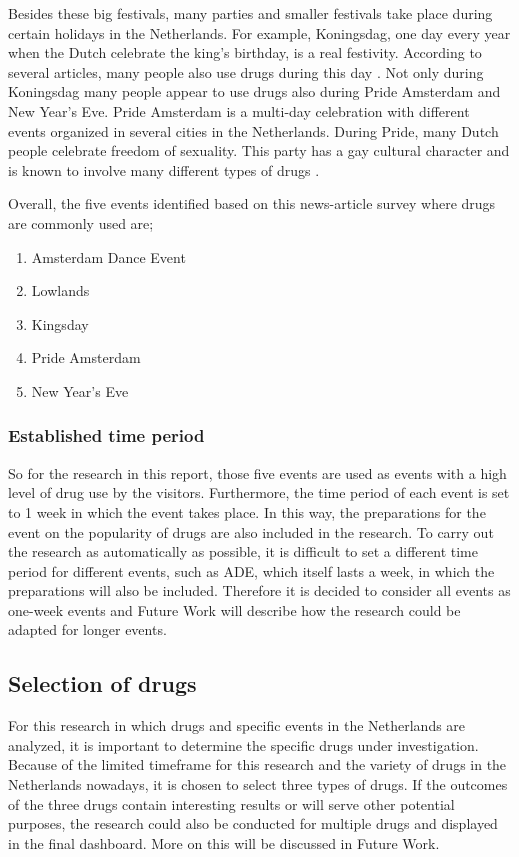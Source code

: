 Besides these big festivals, many parties and smaller festivals take place during certain holidays in the Netherlands. For example, Koningsdag, one day every year when the Dutch celebrate the king's birthday, is a real festivity. According to several articles, many people also use drugs during this day \cite{Boer}. Not only during Koningsdag many people appear to use drugs also during Pride Amsterdam and New Year's Eve. Pride Amsterdam is a multi-day celebration with different events organized in several cities in the Netherlands. During Pride, many Dutch people celebrate freedom of sexuality. This party has a gay cultural character and is known to involve many different types of drugs \cite{Beusekamp}.

Overall, the five events identified based on this news-article survey where drugs are commonly used are;

\begin{enumerate}
  \item Amsterdam Dance Event
  \item Lowlands
  \item Kingsday
  \item Pride Amsterdam
  \item New Year's Eve
\end{enumerate}

\subsubsection{Established time period}

So for the research in this report, those five events are used as events with a high level of drug use by the visitors. Furthermore, the time period of each event is set to 1 week in which the event takes place. In this way, the preparations for the event on the popularity of drugs are also included in the research. To carry out the research as automatically as possible, it is difficult to set a different time period for different events, such as ADE, which itself lasts a week, in which the preparations will also be included. Therefore it is decided to consider all events as one-week events and Future Work will describe how the research could be adapted for longer events. 

\subsection{Selection of drugs}

For this research in which drugs and specific events in the Netherlands are analyzed, it is important to determine the specific drugs under investigation. Because of the limited timeframe for this research and the variety of drugs in the Netherlands nowadays, it is chosen to select three types of drugs. If the outcomes of the three drugs contain interesting results or will serve other potential purposes, the research could also be conducted for multiple drugs and displayed in the final dashboard. More on this will be discussed in Future Work.

